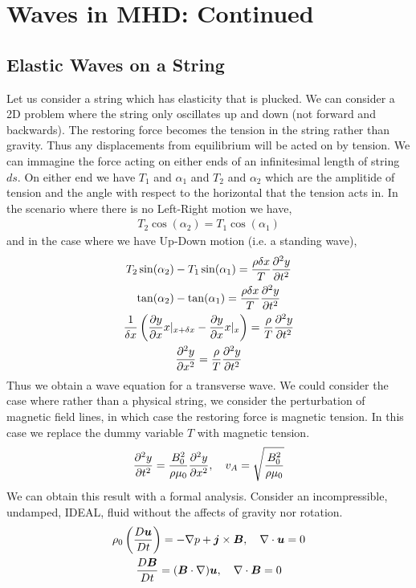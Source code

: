 \documentclass{article}
\begin{document}
\section{Waves in MHD: Continued}

\subsection{Elastic Waves on a String}
Let us consider a string which has elasticity that is plucked. We can consider a
2D problem where the string only oscillates up and down (not forward and
backwards). The restoring force becomes the tension in the string rather than
gravity. Thus any displacements from equilibrium will be acted on by tension. We
can immagine the force acting on either ends of an infinitesimal length of
string $ds$. On either end we have $T_1$ and $\alpha_1$ and $T_2$ and $\alpha_2$
which  are the amplitide of tension and the angle with respect to the horizontal
that the tension acts in. In the scenario where there is no Left-Right motion we
have, 
\begin{gather*}
    T_2\cos(\alpha_2) = T_1\cos(\alpha_1)
\end{gather*}
and in the case where we have Up-Down motion (i.e. a standing wave), 
\begin{gather*}
    T_2\sin(\alpha_2) - T_1\sin(\alpha_1) = \frac{\rho \delta x}{T}\frac{\partial^2 y}{\partial t^2}\\
    \tan(\alpha_2)-\tan(\alpha_1) = \frac{\rho \delta x}{T}\frac{\partial^2 y}{\partial t^2}\\
    \frac{1}{\delta x}\left( \frac{\partial y}{\partial x}{x}|_{x+\delta x} - \frac{\partial y}{\partial x}{x}|_{x}\right) =
    \frac{\rho}{T}\frac{\partial^2 y}{\partial t^2}\\
    \frac{\partial^2 y}{\partial x^2} = \frac{\rho}{T}\frac{\partial^2 y}{\partial t^2}
\end{gather*}
Thus we obtain a wave equation for a transverse wave. We could consider the case
where rather than a physical string, we consider the perturbation of magnetic
field lines, in which case the restoring force is magnetic tension. In this case
we replace the dummy variable $T$ with magnetic tension. 
\begin{gather*}
    \frac{\partial^2 y}{\partial t^2} = \frac{B_0^2}{\rho\mu_0}\frac{\partial^2 y}{\partial x^2}, \quad v_A =
    \sqrt{\frac{B_0^2}{\rho\mu_0}}
\end{gather*}
We can obtain this result with a formal analysis. Consider an incompressible,
undamped, IDEAL, fluid without the affects of gravity nor rotation. 
\begin{gather*}
    \rho_0\left(\frac{D \boldsymbol{u}}{D t}\right) = -\nabla p + \boldsymbol{j}\times\boldsymbol{B}, \quad \nabla \cdot{\boldsymbol{u}}
    = 0\\
    \frac{D \boldsymbol{B}}{D t} = (\boldsymbol{B}\cdot\nabla)\boldsymbol{u}, \quad \nabla \cdot{\boldsymbol{B}} = 0
\end{gather*}
\end{document}
